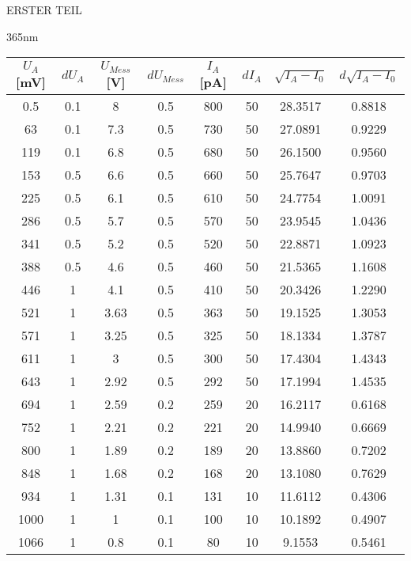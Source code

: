 \begin{appendix}
\begin{chapter}{ERSTER TEIL}
\begin{section}{365nm}
        \begin{table}[htbp]
          \centering
          \footnotesize
          \begin{tabular}{|c|c|c|c|c|c|c|c|}
            \hline
            $U_{A}$ [mV] & $dU_{A}$ & $U_{Mess}$ [V] & $dU_{Mess}$ & 
                $I_{A}$ [pA] & $dI_{A}$ & $\sqrt{I_{A}-I_0}$ & 
                $d\sqrt{I_{A}-I_0}$ \\ \hline
            0.5 & 0.1 & 8 & 0.5 & 800 & 50 & 28.3517 & 0.8818 \\ \hline
            63 & 0.1 & 7.3 & 0.5 & 730 & 50 & 27.0891 & 0.9229 \\ \hline
            119 & 0.1 & 6.8 & 0.5 & 680 & 50 & 26.1500 & 0.9560 \\ \hline
            153 & 0.5 & 6.6 & 0.5 & 660 & 50 & 25.7647 & 0.9703 \\ \hline
            225 & 0.5 & 6.1 & 0.5 & 610 & 50 & 24.7754 & 1.0091 \\ \hline
            286 & 0.5 & 5.7 & 0.5 & 570 & 50 & 23.9545 & 1.0436 \\ \hline
            341 & 0.5 & 5.2 & 0.5 & 520 & 50 & 22.8871 & 1.0923 \\ \hline
            388 & 0.5 & 4.6 & 0.5 & 460 & 50 & 21.5365 & 1.1608 \\ \hline
            446 & 1 & 4.1 & 0.5 & 410 & 50 & 20.3426 & 1.2290 \\ \hline
            521 & 1 & 3.63 & 0.5 & 363 & 50 & 19.1525 & 1.3053 \\ \hline
            571 & 1 & 3.25 & 0.5 & 325 & 50 & 18.1334 & 1.3787 \\ \hline
            611 & 1 & 3 & 0.5 & 300 & 50 & 17.4304 & 1.4343 \\ \hline
            643 & 1 & 2.92 & 0.5 & 292 & 50 & 17.1994 & 1.4535 \\ \hline
            694 & 1 & 2.59 & 0.2 & 259 & 20 & 16.2117 & 0.6168 \\ \hline
            752 & 1 & 2.21 & 0.2 & 221 & 20 & 14.9940 & 0.6669 \\ \hline
            800 & 1 & 1.89 & 0.2 & 189 & 20 & 13.8860 & 0.7202 \\ \hline
            848 & 1 & 1.68 & 0.2 & 168 & 20 & 13.1080 & 0.7629 \\ \hline
            934 & 1 & 1.31 & 0.1 & 131 & 10 & 11.6112 & 0.4306 \\ \hline
            1000 & 1 & 1 & 0.1 & 100 & 10 & 10.1892 & 0.4907 \\ \hline
            1066 & 1 & 0.8 & 0.1 & 80 & 10 & 9.1553 & 0.5461 \\ \hline

\end{tabular}
\end{table}
\end{section}
\end{chapter}
\end{appendix}
